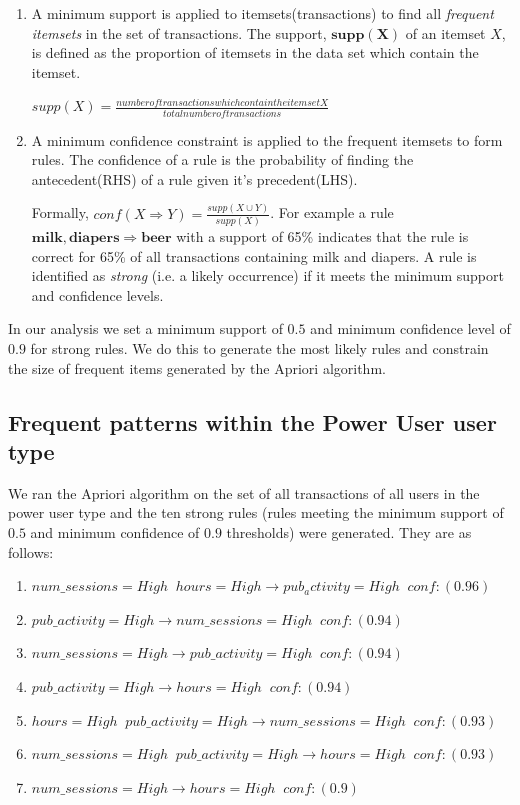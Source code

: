 \documentclass{acm_proc_article-sp}
\begin{document}
\begin{enumerate}
\item A minimum support is applied to itemsets(transactions) to find all \textit{frequent itemsets} in the set of transactions.
The support, $\mathbf{supp(X)}$ of an itemset $X$, is defined as the proportion of itemsets in the data set which contain the 
itemset.



$supp\left(X\right) = \frac{number of transactions which contain the itemset X}{total number of transactions}$



\item A minimum confidence constraint is applied to the frequent itemsets to form rules. The confidence of a rule is the probability of finding the antecedent(RHS) of a rule given it's precedent(LHS).

Formally, $conf(X \Longrightarrow Y) = \frac{supp\left(X \cup Y\right)}{supp\left(X\right)}$. 
For example a rule $\mathbf{milk,diapers \Longrightarrow {beer}}$ with a support of 65\% indicates that the rule is correct for 65\% of all transactions containing milk and diapers.
 A rule is identified as \textit{strong} (i.e. a likely occurrence) if it meets the minimum support and confidence levels.
\end{enumerate}

In our analysis we set a minimum support of $0.5$ and minimum confidence level of $0.9$ for strong rules. We do this to generate the most likely rules and constrain the size of frequent items generated by the Apriori algorithm.

\subsection {Frequent patterns within the Power User user type}
We ran the Apriori algorithm on the set of all transactions of all users in the power user type and the ten strong rules (rules meeting the minimum support of $0.5$ and minimum confidence of $0.9$ thresholds) were generated. They are as follows:

\begin{enumerate}
 \item $num\_sessions=High \;\; hours=High \longrightarrow pub_activity=High   \;\;conf:(0.96)$
 \item $pub\_activity=High \longrightarrow num\_sessions=High  \;\;  conf:(0.94)$
 \item $num\_sessions=High \longrightarrow pub\_activity=High   \;\; conf:(0.94)$
 \item $pub\_activity=High \longrightarrow hours=High  \;\;  conf:(0.94)$
 \item $hours=High \;\; pub\_activity=High \longrightarrow num\_sessions=High  \;\; conf:(0.93)$
 \item $num\_sessions=High \;\; pub\_activity=High \longrightarrow hours=High   \;\;conf:(0.93)$
 \item $num\_sessions=High  \longrightarrow hours=High \;\;  conf:(0.9)$
\end{enumerate}
\end{document}
